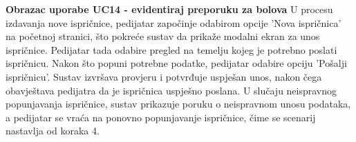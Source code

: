 				\noindent\textbf{Obrazac uporabe UC14 - evidentiraj preporuku za bolova}
				U procesu izdavanja nove ispričnice, pedijatar započinje odabirom opcije 'Nova ispričnica' 
				na početnoj stranici, što pokreće sustav da prikaže modalni ekran za unos ispričnice. 
				Pedijatar tada odabire pregled na temelju kojeg je potrebno poslati ispričnicu. Nakon 
				što popuni potrebne podatke, pedijatar odabire opciju 'Pošalji ispričnicu'. Sustav 
				izvršava provjeru i potvrđuje uspješan unos, nakon čega obavještava pedijatra da je 
				ispričnica uspješno poslana. U slučaju neispravnog popunjavanja ispričnice, sustav 
				prikazuje poruku o neispravnom unosu podataka, a pedijatar se vraća na ponovno 
				popunjavanje ispričnice, čime se scenarij nastavlja od koraka 4. \\
				\eject
	

